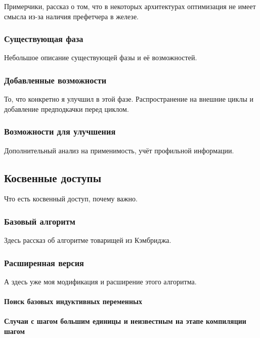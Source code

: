 \documentclass[12pt,a4paper]{article}
\begin{document}
Примерчики, рассказ о том, что в некоторых архитектурах оптимизация не имеет смысла из-за наличия префетчера в железе.

\subsubsection{Существующая фаза}

Небольшое описание существующей фазы и её возможностей.

\subsubsection{Добавленные возможности}

То, что конкретно я улучшил в этой фазе. Распространение на внешние циклы и добавление предподкачки перед циклом.

\subsubsection{Возможности для улучшения}

Дополнительный анализ на применимость, учёт профильной информации.

\subsection{Косвенные доступы}

Что есть косвенный доступ, почему важно.

\subsubsection{Базовый алгоритм}

Здесь рассказ об алгоритме товарищей из Кэмбриджа.

\subsubsection{Расширенная версия}

А здесь уже моя модификация и расширение этого алгоритма.

\paragraph{Поиск базовых индуктивных переменных}

\paragraph{Случаи с шагом большим единицы и неизвестным на этапе компиляции шагом}
\end{document}
